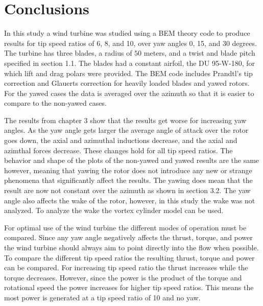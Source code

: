 \chapter{Conclusions}

In this study a wind turbine was studied using a BEM theory code to produce results for tip speed ratios of 6, 8, and 10, over yaw angles 0, 15, and 30 degrees. The turbine has three blades, a radius of $50$ meters, and a twist and blade pitch specified in section 1.1. The blades had a constant airfoil, the DU 95-W-180, for which lift and drag polars were provided. The BEM code includes Prandtl's tip correction and Glauerts correction for heavily loaded blades and yawed rotors. For the yawed cases the data is averaged over the azimuth so that it is easier to compare to the non-yawed cases.

The results from chapter 3 show that the results get worse for increasing yaw angles. As the yaw angle gets larger the average angle of attack over the rotor goes down, the axial and azimuthal inductions decrease, and the axial and azimthal forces decrease. These changes hold for all tip speed ratios. The behavior and shape of the plots of the non-yawed and yawed results are the same however, meaning that yawing the rotor does not introduce any new or strange phenomena that significantly affect the results. The yawing does mean that the result are now not constant over the azimuth as shown in section 3.2. The yaw angle also affects the wake of the rotor, however, in this study the wake was not analyzed. To analyze the wake the vortex cylinder model can be used. 

For optimal use of the wind turbine the different modes of operation must be compared. Since any yaw angle negatively affects the thrust, torque, and power the wind turbine should always aim to point directly into the flow when possible. To compare the different tip speed ratios the resulting thrust, torque and power can be compared. For increasing tip speed ratio the thrust increases while the torque decreases. However, since the power is the product of the torque and rotational speed the power increases for higher tip speed ratios. This means the most power is generated at a tip speed ratio of 10 and no yaw.

